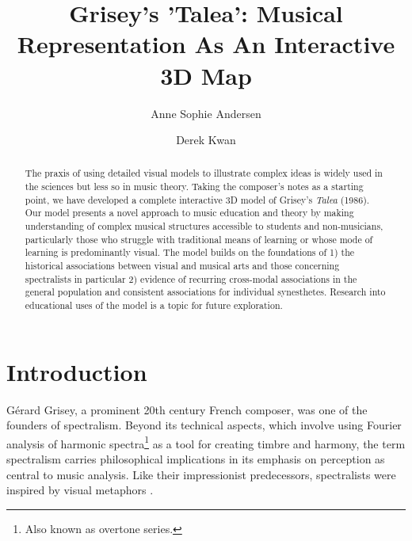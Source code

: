 \documentclass[sigconf]{nimeart}
\begin{document}
\title[Grisey’s 'Talea': Musical Representation As An Interactive 3D Map]{Grisey’s 'Talea': Musical Representation As An Interactive 3D Map}
\author{Anne Sophie Andersen}
\author{Derek Kwan}
\renewcommand{\shortauthors}{Andersen and Kwan}
\begin{abstract}
The praxis of using detailed visual models to illustrate complex ideas is widely used in the sciences but less so in music theory. Taking the composer's notes as a starting point, we have developed a complete interactive 3D model of Grisey's \emph{Talea} (1986). Our model presents a novel approach to music education and theory by making understanding of complex musical structures accessible to students and non-musicians, particularly those who struggle with traditional means of learning or whose mode of learning is predominantly visual. The model builds on the foundations of 1) the historical associations between visual and musical arts and those concerning spectralists in particular 2) evidence of recurring cross-modal associations in the general population and consistent associations for individual synesthetes. Research into educational uses of the model is a topic for future exploration.
\end{abstract}

\maketitle

\section{Introduction}\label{introduction}

Gérard Grisey, a prominent 20th century French composer, was one of the founders of spectralism. Beyond its technical aspects, which involve using Fourier analysis of harmonic spectra\footnote{Also known as overtone series.} as a tool for creating timbre and harmony, the term spectralism carries philosophical implications in its emphasis on perception as central to music analysis. Like their impressionist predecessors, spectralists were inspired by visual metaphors \cite{c1,c2,c3,c4,c5}.
\end{document}
